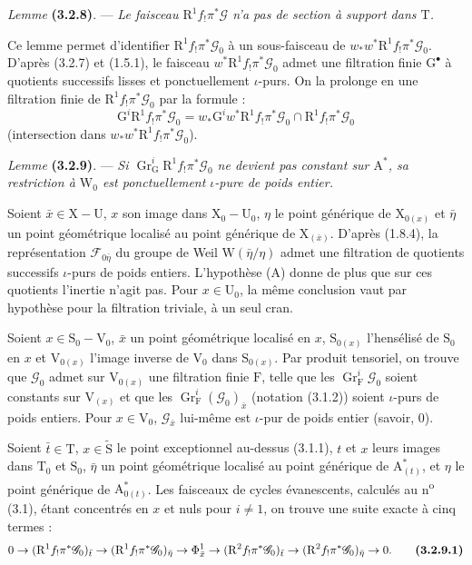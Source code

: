 \documentclass[11pt,leqno]{article}
\begin{document}
\textit{Lemme} \textbf{(3.2.8)}. — \textit{Le faisceau \(\mathrm{R}^1f_!\pi^*\mathscr{G}\) n’a pas de section à support dans \(\mathrm{T}\).}

Ce lemme permet d’identifier \(\mathrm{R}^1f_!\pi^*\mathscr{G}_0\) à un sous-faisceau de \(w_*w^*\mathrm{R}^1f_!\pi^*\mathscr{G}_0\). D’après (3.2.7) et (1.5.1), le faisceau \(w^*\mathrm{R}^1f_!\pi^*\mathscr{G}_0\) admet une filtration finie \(\mathrm{G}^\bullet\) à quotients successifs lisses et ponctuellement \(\iota\)-purs. On la prolonge en une filtration finie de \(\mathrm{R}^1f_!\pi^*\mathscr{G}_0\) par la formule :
\[
\mathrm{G}^i\mathrm{R}^1f_!\pi^*\mathscr{G}_0
=w_*\mathrm{G}^iw^*\mathrm{R}^1f_!\pi^*\mathscr{G}_0
\cap\mathrm{R}^1f_!\pi^*\mathscr{G}_0
\]
(intersection dans \(w_*w^*\mathrm{R}^1f_!\pi^*\mathscr{G}_0\)).

\textit{Lemme} \textbf{(3.2.9)}. — \textit{Si \(\operatorname{Gr}_{\mathrm{G}}^i\mathrm{R}^1f_!\pi^*\mathscr{G}_0\) ne devient pas constant sur \(\mathrm{A}^*\), sa restriction à \(\mathrm{W}_0\) est ponctuellement \(\iota\)-pure de poids entier.}

Soient \(\bar{x}\in\mathrm{X}-\mathrm{U}\), \(x\) son image dans \(\mathrm{X}_0-\mathrm{U}_0\), \(\eta\) le point générique de \(\mathrm{X}_{0(x)}\) et \(\bar{\eta}\) un point géométrique localisé au point générique de \(\mathrm{X}_{(\bar{x})}\). D’après (1.8.4), la représentation \(\mathscr{F}_{0\bar{\eta}}\) du groupe de Weil \(\mathrm{W}(\bar{\eta}/\eta)\) admet une filtration de quotients successifs \(\iota\)-purs de poids entiers. L’hypothèse (A) donne de plus que sur ces quotients l’inertie n’agit pas. Pour \(x\in\mathrm{U}_0\), la même conclusion vaut par hypothèse pour la filtration triviale, à un seul cran.

Soient \(x\in\mathrm{S}_0-\mathrm{V}_0\), \(\bar{x}\) un point géométrique localisé en \(x\), \(\mathrm{S}_{0(x)}\) l’hensélisé de \(\mathrm{S}_0\) en \(x\) et \(\mathrm{V}_{0(x)}\) l’image inverse de \(\mathrm{V}_0\) dans \(\mathrm{S}_{0(x)}\). Par produit tensoriel, on trouve que \(\mathscr{G}_0\) admet sur \(\mathrm{V}_{0(x)}\) une filtration finie \(\mathrm{F}\), telle que les \(\operatorname{Gr}_{\mathrm{F}}^i\mathscr{G}_0\) soient constants sur \(\mathrm{V}_{(x)}\) et que les \(\operatorname{Gr}_{\mathrm{F}}^i(\mathscr{G}_0)_{\bar{x}}\) (notation (3.1.2)) soient \(\iota\)-purs de poids entiers. Pour \(x\in\mathrm{V}_0\), \(\mathscr{G}_{\bar{x}}\) lui-même est \(\iota\)-pur de poids entier (savoir, \(0\)).

Soient \(\bar{t}\in\mathrm{T}\), \(x\in\widetilde{\mathrm{S}}\) le point exceptionnel au-dessus (3.1.1), \(t\) et \(x\) leurs images dans \(\mathrm{T}_0\) et \(\mathrm{S}_0\), \(\bar{\eta}\) un point géométrique localisé au point générique de \(\mathrm{A}_{(t)}^*\), et \(\eta\) le point générique de \(\mathrm{A}_{0(t)}^*\). Les faisceaux de cycles évanescents, calculés au n\textsuperscript{o} (3.1), étant concentrés en \(x\) et nuls pour \(i\neq1\), on trouve une suite exacte à cinq termes :
\[
0\to(\mathrm{R}^1f_!\pi^*\mathscr{G}_0)_{\bar{t}}
\to(\mathrm{R}^1f_!\pi^*\mathscr{G}_0)_{\bar{\eta}}
\to\Phi_{\bar{x}}^1
\to(\mathrm{R}^2f_!\pi^*\mathscr{G}_0)_{\bar{t}}
\to(\mathrm{R}^2f_!\pi^*\mathscr{G}_0)_{\bar{\eta}}\to0.
\tag*{\textbf{(3.2.9.1)}}
\]
\end{document}
